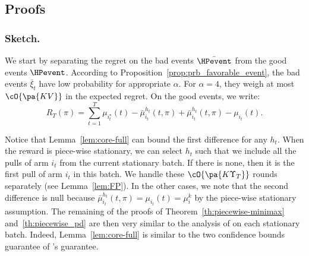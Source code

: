 \subsection{Proofs}
\label{ss:restless-proof}

\subsubsection*{Sketch.} 

We start by separating the regret on the bad events $\bar{\HPevent}$ from the good events $\HPevent$. According to Proposition~\ref{prop:prb_favorable_event}, the bad events $\bar{\xi}_t$ have low probability for appropriate $\alpha$. For $\alpha = 4$, they weigh at most $\cO{\pa{KV}}$ in the expected regret.  On the good events, we write:
\vspace{-4pt}
\begin{equation}
\label{eq:restless-regret-decompo}
R_T(\pi)= \sum_{t=1}^T \mu_{i_t^\star}(t) - \bar{\mu}_{i_t}^{h_t}(t, \pi) + \bar{\mu}_{i_t}^{h_t}(t, \pi) - \mu_{i_t}(t).   
\end{equation}

Notice that Lemma~\ref{lem:core-full} can bound the first difference for any $h_t$. When the reward is piece-wise stationary, we can select $h_t$ such that we include all the pulls of arm $i_t$ from the current stationary batch. If there is none, then it is the first pull of arm $i_t$ in this batch. We handle these $\cO{\pa{K\Upsilon_T}}$ rounds separately (see Lemma~\ref{lem:FP}). In the other cases, we note that the second difference is null because $\bar{\mu}_{i_t}^{h_t}(t, \pi) = \mu_{i_t}(t) = \mu_i^k$ by the piece-wise stationary assumption. The remaining of the proofs of Theorem~\ref{th:piecewise-minimax} and~\ref{th:piecewise_pd} are then very similar to the analysis of \cite{auer2002finite} on each stationary batch. Indeed, Lemma~\ref{lem:core-full} is similar to the two confidence bounds guarantee of \UCBone's guarantee.

